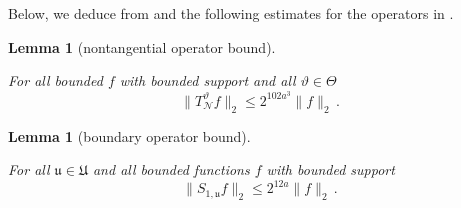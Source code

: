 \documentclass[10pt,a4paper]{article}
\theoremstyle{plain}
\newtheorem{lemma}[theorem]{Lemma}
\theoremstyle{definition}
\numberwithin{equation}{subsection}
\newcommand{\fu}{{\mathfrak u}}
\newcommand{\fU}{{\mathfrak U}}
\newcommand{\mfa}{{\vartheta}}
\newcommand{\Mf}{{\Theta}}
\newcommand{\lean}[1]{}
\newcommand{\uses}[1]{}
\newcommand{\leanok}{}
\begin{document}
Below, we deduce  from  and the following estimates for the operators in .

\begin{lemma}[nontangential operator bound]
    \label{nontangential-operator-bound}
    \leanok
    \lean{TileStructure.Forest.nontangential_operator_bound}
    \uses{Hardy-Littlewood}
    For all bounded $f$ with bounded support and all $\mfa \in \Mf$
    $$
        \|T_{\mathcal{N}}^{\mfa} f\|_2 \le 2^{102a^3} \|f\|_2\,.
    $$
\end{lemma}

\begin{lemma}[boundary operator bound]
    \label{boundary-operator-bound}
    \leanok
    \lean{TileStructure.Forest.boundary_operator_bound}
    \uses{Hardy-Littlewood,boundary-overlap}
    For all $\fu \in \fU$ and all bounded functions $f$ with bounded support
    \begin{equation}
        \label{eq-S-bound}
        \|S_{1,\fu}f\|_2 \le 2^{12a} \|f\|_2\,.
    \end{equation}
\end{lemma}
\end{document}
